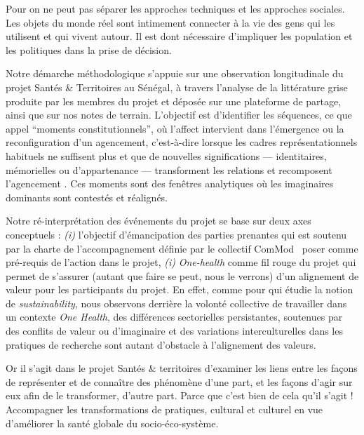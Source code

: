 \documentclass{article}
\begin{document}
Pour \textcite{pfotenhauer_learning_2012} on ne peut pas séparer les approches techniques et les approches sociales. Les objets du monde réel sont intimement connecter à la vie des gens qui les utilisent et qui vivent autour. Il est dont nécessaire d'impliquer les population et les politiques dans la prise de décision.

Notre démarche méthodologique s’appuie sur une observation longitudinale du projet Santés \& Territoires au Sénégal, à travers l’analyse de la littérature grise produite par les membres du projet et déposée sur une plateforme de partage, ainsi que sur nos notes de terrain. L’objectif est d’identifier les séquences, ce que \textcite{jasanoff_constitutional_2011} appel “moments constitutionnels”, où l’affect intervient dans l’émergence ou la reconfiguration d’un agencement, c’est-à-dire lorsque les cadres représentationnels habituels ne suffisent plus et que de nouvelles significations — identitaires, mémorielles ou d’appartenance — transforment les relations et recomposent l’agencement \parencite{hertz_knowledge_2025}. Ces moments sont des fenêtres analytiques où les imaginaires dominants sont contestés et réalignés.

Notre ré-interprétation des événements du projet se base sur deux axes conceptuels : \textit{(i)} l'objectif d'émancipation des parties prenantes qui est soutenu par la charte de l'accompagnement définie par le collectif ComMod~\parencite{barreteau_our_2003} poser comme pré-requis de l'action dans le projet, \textit{(i)} \textit{One-health} comme fil rouge du projet qui permet de s'assurer (autant que faire se peut, nous le verrons) d'un alignement de valeur pour les participants du projet. En effet, comme pour \textcite[p.144]{beck_governance_2021} qui étudie la notion de \textit{sustainability}, nous observons derrière la volonté collective de travailler dans un contexte \textit{One Health}, des différences sectorielles persistantes, soutenues par des conflits de valeur ou d'imaginaire et des variations interculturelles dans les pratiques de recherche sont autant d'obstacle à l'alignement des valeurs.

Or il s'agit dans le projet Santés \& territoires d'examiner les liens entre les façons de représenter et de connaître des phénomène d'une part, et les façons d'agir sur eux afin de le transformer, d'autre part. Parce que c'est bien de cela qu'il s'agit ! Accompagner les transformations de pratiques, cultural et culturel en vue d'améliorer la santé globale du socio-éco-système. 
\end{document}
